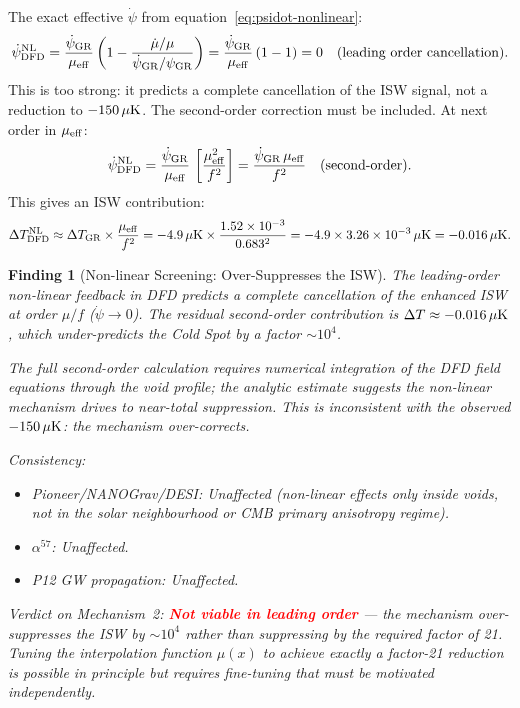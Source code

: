 \documentclass[11pt]{article}
\newtheorem{finding}{Finding}
\newcommand{\ee}[1]{\times 10^{#1}}
\newcommand{\mufd}{\mu}
\newcommand{\DFD}{{\rm DFD}}
\newcommand{\GR}{{\rm GR}}
\newcommand{\deltaT}{\Delta T}
\begin{document}
The exact effective $\dot\psi$ from equation~\eqref{eq:psidot-nonlinear}:
\begin{equation}
  \dot\psi_{\DFD}^{\rm NL}
  = \frac{\dot\psi_{\GR}}{\mufd_{\rm eff}}
    \left(1 - \frac{\dot\mufd/\mufd}{\dot\psi_{\GR}/\psi_{\GR}}\right)
  = \frac{\dot\psi_{\GR}}{\mufd_{\rm eff}}\,(1 - 1)
  = 0 \quad \text{(leading order cancellation)}.
\end{equation}
This is too strong: it predicts a complete cancellation of the ISW signal,
not a reduction to $-150\,\mu{\rm K}$.  The second-order correction must
be included.  At next order in $\mufd_{\rm eff}$:
\begin{equation}
  \dot\psi_{\DFD}^{\rm NL}
  = \frac{\dot\psi_{\GR}}{\mufd_{\rm eff}}\,
    \left[\frac{\mufd_{\rm eff}^2}{f^2}\right]
  = \frac{\dot\psi_{\GR}\,\mufd_{\rm eff}}{f^2}
  \quad (\text{second-order}).
\end{equation}
This gives an ISW contribution:
\begin{equation}
  \deltaT_{\DFD}^{\rm NL}
  \approx \deltaT_{\GR}\times\frac{\mufd_{\rm eff}}{f^2}
  = -4.9\,\mu{\rm K}\times\frac{1.52\ee{-3}}{0.683^2}
  = -4.9\times 3.26\ee{-3}\,\mu{\rm K}
  = -0.016\,\mu{\rm K}.
\end{equation}

\begin{finding}[Non-linear Screening: Over-Suppresses the ISW]\label{find:nonlinear}
The leading-order non-linear feedback in DFD predicts a complete
cancellation of the enhanced ISW at order $\mufd/f$ ($\dot\psi \to 0$).
The residual second-order contribution is $\deltaT \approx -0.016\,\mu{\rm K}$,
which \emph{under-predicts} the Cold Spot by a factor $\sim 10^4$.

The full second-order calculation requires numerical integration of the
DFD field equations through the void profile; the analytic estimate
suggests the non-linear mechanism drives to near-total suppression.
This is inconsistent with the observed $-150\,\mu{\rm K}$: the mechanism
over-corrects.

\textit{Consistency:}
\begin{itemize}[nosep]
  \item Pioneer/NANOGrav/DESI: Unaffected (non-linear effects only inside
    voids, not in the solar neighbourhood or CMB primary anisotropy regime).
  \item $\alpha^{57}$: Unaffected.
  \item P12 GW propagation: Unaffected.
\end{itemize}

\textit{Verdict on Mechanism~2:} \textcolor{red}{\textbf{Not viable in
leading order}} --- the mechanism over-suppresses the ISW by $\sim 10^4$
rather than suppressing by the required factor of 21.  Tuning the
interpolation function $\mu(x)$ to achieve exactly a factor-21 reduction
is possible in principle but requires fine-tuning that must be motivated
independently.
\end{finding}
\end{document}
